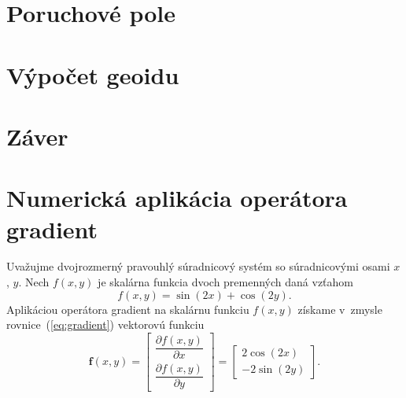 \documentclass[a4paper, 12pt]{book}
\let\vec\mathbf
\begin{document}
\chapter{Poruchové pole}
\label{sec:disturbing_field}








\chapter{Výpočet geoidu}
\label{sec:geoid_determination}







\chapter*{Záver}







\appendix
\chapter{Numerická aplikácia operátora gradient}
\label{app:numerical_application_of_gradient}

Uvažujme dvojrozmerný pravouhlý súradnicový systém so súradnicovými osami $x$,
$y$.  Nech $f(x, y)$ je skalárna funkcia dvoch premenných daná vzťahom
%
\begin{equation}
\label{eq:f}
f(x, y) = \sin(2x) + \cos(2y){.}
\end{equation}
%
Aplikáciou operátora gradient na skalárnu funkciu $f(x, y)$ získame v~zmysle
rovnice~(\ref{eq:gradient}) vektorovú funkciu
%
\begin{equation}
\label{eq:gradf}
\vec f(x, y) =
\begin{bmatrix}
\dfrac{\partial f(x, y)}{\partial x} \\[2ex]
\dfrac{\partial f(x, y)}{\partial y}
\end{bmatrix}
=
\begin{bmatrix}
2 \cos(2x) \\[2ex]
-2 \sin(2y)
\end{bmatrix}
{.}
\end{equation}
\end{document}
